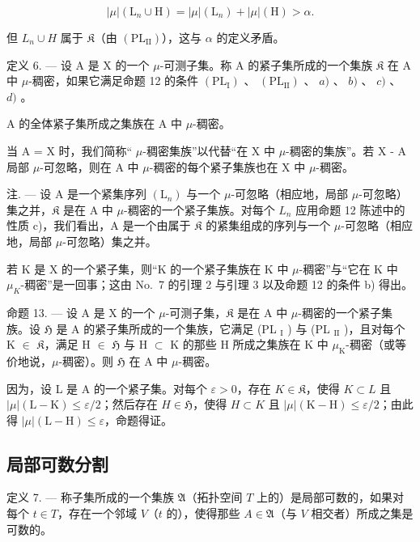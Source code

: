 \[
| \mu | (\mathrm{L} _ {n} \cup \mathrm{H}) = | \mu | (\mathrm{L} _ {n}) + | \mu | (\mathrm{H}) > \alpha .
\]

但 \(L_{n} \cup H\) 属于 \(\mathfrak{K}\)（由 \((\mathrm{PL}_{\mathrm{II}})\)），这与 \(\alpha\) 的定义矛盾。

定义 6. --- 设 A 是 X 的一个 \(\mu\)-可测子集。称 A 的紧子集所成的一个集族 \(\mathfrak{K}\) 在 A 中 \(\mu\)-稠密，如果它满足命题 12 的条件 \((\mathrm{PL}_{\mathrm{I}})\) 、 \((\mathrm{PL}_{\mathrm{II}})\) 、 \(a)\) 、 \(b)\) 、 \(c)\) 、 \(d)\) 。

A 的全体紧子集所成之集族在 A 中 \(\mu\)-稠密。

当 A = X 时，我们简称“ \(\mu\)-稠密集族”以代替“在 X 中 \(\mu\)-稠密的集族”。若 X - A 局部 \(\mu\)-可忽略，则在 A 中 \(\mu\)-稠密的每个紧子集族也在 X 中 \(\mu\)-稠密。

注. --- 设 A 是一个紧集序列 \((\mathrm{L}_{n})\) 与一个 \(\mu\)-可忽略（相应地，局部 \(\mu\)-可忽略）集之并，\(\mathfrak{K}\) 是在 A 中 \(\mu\)-稠密的一个紧子集族。对每个 \(L_{n}\) 应用命题 12 陈述中的性质 c)，我们看出，A 是一个由属于 \(\mathfrak{K}\) 的紧集组成的序列与一个 \(\mu\)-可忽略（相应地，局部 \(\mu\)-可忽略）集之并。

若 K 是 X 的一个紧子集，则“K 的一个紧子集族在 K 中 \(\mu\)-稠密”与“它在 K 中 \(\mu_{K}\)-稠密”是一回事；这由 No.~7 的引理 2 与引理 3 以及命题 12 的条件 b) 得出。

命题 13. --- 设 A 是 X 的一个 \(\mu\)-可测子集，\(\mathfrak{K}\) 是在 A 中 \(\mu\)-稠密的一个紧子集族。设 \(\mathfrak{H}\) 是 A 的紧子集所成的一个集族，它满足 (PL \(_{\text{I}}\) ) 与 (PL \(_{\text{II}}\) )，且对每个 K \(\in\) \(\mathfrak{K}\)，满足 H \(\in\) \(\mathfrak{H}\) 与 H \(\subset\) K 的那些 H 所成之集族在 K 中 \(\mu_{\text{K}}\)-稠密（或等价地说，\(\mu\)-稠密）。则 \(\mathfrak{H}\) 在 A 中 \(\mu\)-稠密。

因为，设 L 是 A 的一个紧子集。对每个 \(\varepsilon > 0\)，存在 \(K \in \mathfrak{K}\)，使得 \(K \subset L\) 且 \(|\mu|(\mathrm{L} - \mathrm{K}) \leqslant \varepsilon/2\)；然后存在 \(H \in \mathfrak{H}\)，使得 \(H \subset K\) 且 \(|\mu|(\mathrm{K} - \mathrm{H}) \leqslant \varepsilon/2\)；由此得 \(|\mu|(\mathrm{L} - \mathrm{H}) \leqslant \varepsilon\)，命题得证。

\subsection{局部可数分割}

定义 7. --- 称子集所成的一个集族 \(\mathfrak{A}\)（拓扑空间 \(T\) 上的）是局部可数的，如果对每个 \(t \in T\)，存在一个邻域 \(V\)（\(t\) 的），使得那些 \(A \in \mathfrak{A}\)（与 \(V\) 相交者）所成之集是可数的。

